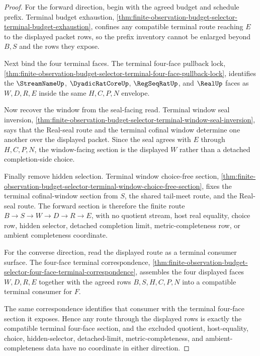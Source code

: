 \begin{proof}
For the forward direction, begin with the agreed budget and schedule prefix. Terminal budget exhaustion, \autoref{thm:finite-observation-budget-selector-terminal-budget-exhaustion}, confines any compatible terminal route reaching $E$ to the displayed packet rows, so the prefix inventory cannot be enlarged beyond $B,S$ and the rows they expose.

Next bind the four terminal faces. The terminal four-face pullback lock, \autoref{thm:finite-observation-budget-selector-terminal-four-face-pullback-lock}, identifies the $\StreamNameUp$, $\DyadicRatCoreUp$, $\RegSeqRatUp$, and $\RealUp$ faces as $W,D,R,E$ inside the same $H,C,P,N$ envelope.

Now recover the window from the seal-facing read. Terminal window seal inversion, \autoref{thm:finite-observation-budget-selector-terminal-window-seal-inversion}, says that the Real-seal route and the terminal cofinal window determine one another over the displayed packet. Since the seal agrees with $E$ through $H,C,P,N$, the window-facing section is the displayed $W$ rather than a detached completion-side choice.

Finally remove hidden selection. Terminal window choice-free section, \autoref{thm:finite-observation-budget-selector-terminal-window-choice-free-section}, fixes the terminal cofinal-window section from $S$, the shared tail-meet route, and the Real-seal route. The forward section is therefore the finite route $B \to S \to W \to D \to R \to E$, with no quotient stream, host real equality, choice row, hidden selector, detached completion limit, metric-completeness row, or ambient completeness coordinate.

For the converse direction, read the displayed route as a terminal consumer surface. The four-face terminal correspondence, \autoref{thm:finite-observation-budget-selector-four-face-terminal-correspondence}, assembles the four displayed faces $W,D,R,E$ together with the agreed rows $B,S,H,C,P,N$ into a compatible terminal consumer for $F$.

The same correspondence identifies that consumer with the terminal four-face section it exposes. Hence any route through the displayed rows is exactly the compatible terminal four-face section, and the excluded quotient, host-equality, choice, hidden-selector, detached-limit, metric-completeness, and ambient-completeness data have no coordinate in either direction.
\end{proof}

